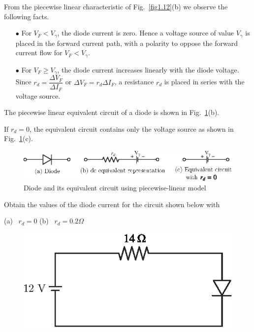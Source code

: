 From the piecewise linear characteristic of Fig.~\ref{fig1.12}(b) we observe the following facts.
\begin{itemize}
\item[$\bullet$] For $V_{F}<V_{\gamma}$, the diode current is zero. Hence a voltage source of value $V_{\gamma}$ is placed in the forward current path, with a polarity to oppose the forward current flow for $V_{F}<V_{\gamma}$.

\item[$\bullet$] For $V_{F}\geq V_{\gamma}$, the diode current increases linearly with the diode voltage. Since $r_{d}=\dfrac{\Delta V_{F}}{\Delta I_{F}}$ or $\Delta V_{F}=r_{d}\Delta I_{F}$, a resistance $r_{d}$ is placed in series with the voltage source.
\end{itemize}

The piecewise linear equivalent circuit of a diode is shown in Fig.~\ref{fig1.13}(b).

If $r_{d}=0$, the equivalent circuit contains only the voltage source as shown in Fig.~\ref{fig1.13}(c).
\begin{figure}[H]
\centering
\includegraphics[scale=1.1]{chap1/S3-EE-01-029.eps}
\caption{Diode and its equivalent circuit using piecewise-linear model}\label{fig1.13}
\end{figure}

\eject

\begin{example}\label{exam1.15}
Obtain the values of the diode current for the circuit shown below
with 

(a)~ $r_d =0$ (b)~ $r_d = 0.2 \Omega$
\begin{figure}[H]
\centering
\includegraphics{chap1/S3-EE-01-UN001.eps}
\end{figure}
\end{example}

